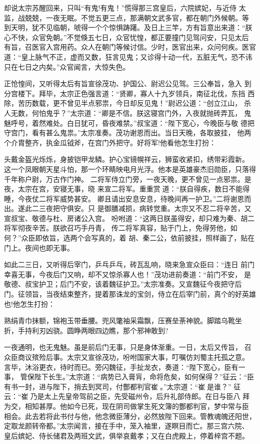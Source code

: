 却说太宗苏醒回来，只叫“有鬼!有鬼！”慌得那三宫皇后，六院嫔妃，与近侍
太监，战兢兢，一夜无眠。不觉五更三点，那满朝文武多官，都在朝门外候朝。等
到天明，犹不见临朝，唬得一个个惊惧踌躇。及日上三竿，方有旨意出来道：“朕
心不快，众官免朝。”不觉倏五七日，众官忧惶，都正要撞门见驾问安，只见太后
有旨，召医官入宫用药。众人在朝门等候讨信。少时，医官出来，众问何疾。医官
道：“皇上脉气不正，虚而又数，狂言见鬼；又诊得十动一代，五脏无气，恐不讳
只在七日之内矣。”众官闻言，大惊失色。

正怆惶间，又听得太后有旨宣徐茂功、护国公、尉迟公见驾。三公奉旨，急入
到分宫楼下。拜毕，太宗正色强言道：“贤卿，寡人十九岁领兵，南征北伐，东挡
西除，苦历数载，更不曾见半点邪祟，今日却反见鬼！”尉迟公道：“创立江山，
杀人无数，何怕鬼乎？”太宗道：“卿是不信。朕这寝宫门外，入夜就抛砖弄瓦，
鬼魅呼号，着然难处。白日犹可，昏夜难禁。”叔宝道：“陛下宽心，今晚臣与敬
德把守宫门，看有甚么鬼祟。”太宗准奏。茂功谢恩而出。当日天晚，各取披挂，
他两个介胄整齐，执金瓜钺斧，在宫门外把守。好将军!他看他怎生打扮：

头戴金盔光烁烁，身披铠甲龙鳞。护心宝镜幌祥云，狮蛮收紧扣，绣带彩霞新。
这一个凤眼朝天星斗怕，那一个环睛映电月光浮。他本是英雄豪杰旧勋臣，只落得
千年称户尉，万古作门神。
二将军侍立门旁，一夜天晚，更不曾见一点邪祟。是夜，太宗在宫，安寝无事，晓
来宣二将军。重重赏道：“朕自得疾，数日不能得睡，今夜仗二将军威势甚安。
卿且请出安息安息，待晚间再一护卫。”二将谢恩而出。遂此二三夜把守俱安。只
是御膳减损，病转觉重。太宗又不忍二将辛苦，又宣叔宝、敬德与杜、房诸公入宫。
吩咐道：“这两日朕虽得安，却只难为秦、胡二将军彻夜辛苦。朕欲召巧手丹青，
传二将军真容，贴于门上，免得劳他，如何？”众臣即依旨，选两个会写真的，着
胡、秦二公，依前披挂，照样画了，贴在门上。夜间也即无事。

如此二三日，又听得后宰门，乒乓乒乓，砖瓦乱响，晓来急宣众臣曰：“连日
前门幸喜无事，今夜后门又响，却不又惊杀寡人也！”茂功进前奏道：“前门不安，
是敬德、叔宝护卫；后门不安，该着魏征护卫。”太宗准奏。又宣魏征今夜把守后
门。征领旨，当夜结束整齐，提着那诛龙的宝剑，侍立在后宰门前，真个的好英雄
也!他怎生打扮：

熟绢青巾抹额，锦袍玉带垂腰。兜风氅袖采霜飘，压赛垒荼神貌。脚踏乌靴坐
折，手持利刃凶骁。圆睁两眼四边瞧，那个邪神敢到?

一夜通明，也无鬼魅。虽是前后门无事，只是身体渐重。一日，太后又传旨，
召众臣商议殡殓后事。太宗又宣徐茂功，吩咐国家大事，叮嘱仿刘蜀主托孤之意。
言毕，沐浴更衣，待时而已。旁闪魏征，手扯龙衣，奏道：“陛下宽心，臣有一事，
管保陛下长生。”太宗道：“病势已入膏肓，命将危矣，如何保得？”征云：“臣
有书一封，进与陛下，捎去到冥司，付酆都判官崔。”太宗道：“崔是谁？”
征云：“崔乃是太上先皇帝驾前之臣，先受磁州令，后升礼部侍郎。在日与臣八
拜为交，相知甚厚。他如今已死，现在阴司做掌生死文簿的酆都判官，梦中常与臣
相会。此去若将此书付与他，他念微臣薄分，必然放陛下回来。管教魂魄还阳世，
定取龙颜转帝都。”太宗闻言，接在手中，笼入袖里，遂瞑目而亡。那三宫六院、
皇后嫔妃、侍长储君及两班文武，俱举哀戴孝；又在白虎殿上，停着梓宫不题。

